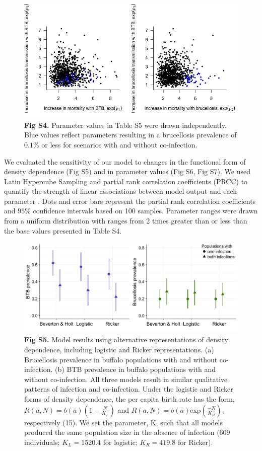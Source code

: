\documentclass[11pt]{article}
\begin{document}
\begin{figure}[H]
  \centering
  \includegraphics[width = 0.9 \textwidth]{FigureS4_MCMCparameters.png}
  \caption*{\textbf{Fig S4.} Parameter values in Table S5 were drawn independently. Blue values reflect parameters resulting in a brucellosis prevalence of $0.1\%$ or less for scenarios with and without co-infection.}
\end{figure}

We evaluated the sensitivity of our model to changes in the functional form of density dependence (Fig S5) and in parameter values (Fig S6, Fig S7). 
We used Latin Hypercube Sampling and partial rank correlation coefficients (PRCC) to quantify the strength of linear associations between model output and each parameter \cite{marino_methodology_2008}. Dots and error bars represent the partial rank correlation coefficients and $95\%$ confidence intervals based on 100 samples. Parameter ranges were drawn from a uniform distribution with ranges from 2 times greater than or less than the base values presented in Table S4.


\begin{figure}[H]
  \centering
  \includegraphics[width = \textwidth]{FigureS5_densitydependence.png}
  \caption*{\textbf{Fig S5.} Model results using alternative representations of density dependence, including logistic and Ricker representations. (a) Brucellosis prevalence in buffalo populations with and without co-infection. (b) BTB prevalence in buffalo populations with and without co-infection.  All three models result in similar qualitative patterns of infection and co-infection. Under the logistic and Ricker forms of density dependence, the per capita birth rate has the form, $R(a,N) = b(a) (1- \frac{N}{K_L} )$ and $R(a,N) = b(a)$exp$(\frac{-N}{K_R})$, respectively (15).  We set the parameter, K, such that all models produced the same population size in the absence of infection (609 individuals; $K_L = 1520.4$ for logistic; $K_R = 419.8 $ for Ricker).}
\end{figure}
\end{document}
